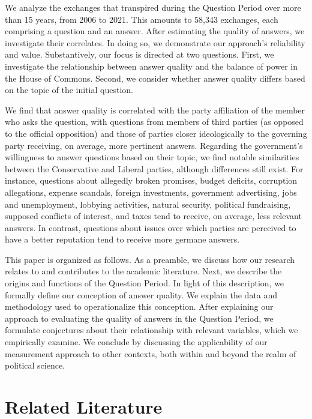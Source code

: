 {{We analyze the exchanges that transpired during the Question Period over more than 15 years, from 2006 to 2021. This amounts to 58,343 exchanges, each comprising a question and an answer. After estimating the quality of answers, we investigate their correlates. In doing so, we demonstrate our approach’s reliability and value. Substantively, our focus is directed at two questions. First, we investigate the relationship between answer quality and the balance of power in the House of Commons. Second, we consider whether answer quality differs based on the topic of the initial question.

We find that answer quality is correlated with the party affiliation of the member who asks the question, with questions from members of third parties (as opposed to the official opposition) and those of parties closer ideologically to the governing party receiving, on average, more pertinent answers. Regarding the government’s willingness to answer questions based on their topic, we find notable similarities between the Conservative and Liberal parties, although differences still exist. For instance, questions about allegedly broken promises, budget deficits, corruption allegations, expense scandals, foreign investments, government advertising, jobs and unemployment, lobbying activities, natural security, political fundraising, supposed conflicts of interest, and taxes tend to receive, on average, less relevant answers. In contrast, questions about issues over which parties are perceived to have a better reputation tend to receive more germane answers.

This paper is organized as follows. As a preamble, we discuss how our research relates to and contributes to the academic literature. Next, we describe the origins and functions of the Question Period. In light of this description, we formally define our conception of answer quality. We explain the data and methodology used to operationalize this conception. After explaining our approach to evaluating the quality of answers in the Question Period, we formulate conjectures about their relationship with relevant variables, which we empirically examine. We conclude by discussing the applicability of our measurement approach to other contexts, both within and beyond the realm of political science.

\section*{Related Literature}

}}

